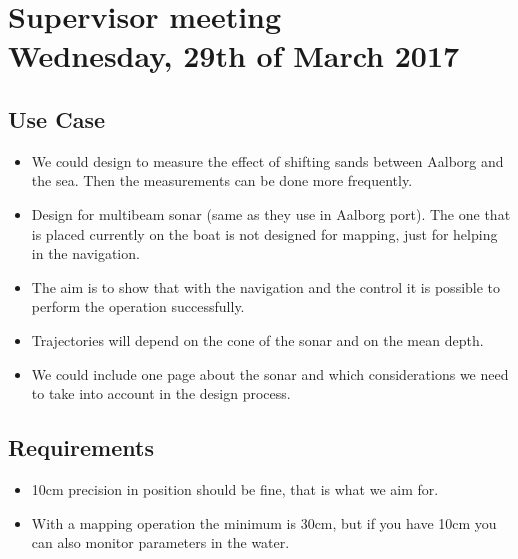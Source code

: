 
\renewcommand{\vec}[1]{\boldsymbol{\mathbf{#1}}}


\section*{Supervisor meeting\\ \small Wednesday, 29th of March 2017}

\subsection{Use Case}
\begin{itemize}
    \item We could design to measure the effect of shifting sands between Aalborg and the sea. Then the measurements can be done more frequently.
    \item Design for multibeam sonar (same as they use in Aalborg port). The one that is placed currently on the boat is not designed for mapping, just for helping in the navigation.
    \item The aim is to show that with the navigation and the control it is possible to perform the operation successfully.
    \item Trajectories will depend on the cone of the sonar and on the mean depth.
    \item We could include one page about the sonar and which considerations we need to take into account in the design process.
\end{itemize}

\subsection{Requirements}
\begin{itemize}
    \item 10cm precision in position should be fine, that is what we aim for. 
    \item With a mapping operation the minimum is 30cm, but if you have 10cm you can also monitor parameters in the water.
\end{itemize}

